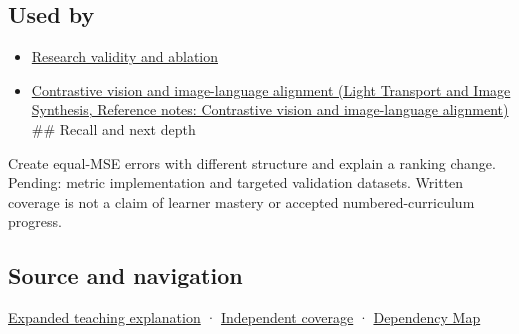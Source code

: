 \subsection{Used by}\label{appendix-b2c1846508bf-used-by}

\begin{itemize}
\item
  \hyperref[appendix-65788587ef78]{Research validity and ablation}
\item
  \href{../04-Light-Transport-and-Image-Synthesis/main.pdf\#nameddest=appendix-772f1fd96148}{Contrastive vision and image-language alignment (Light Transport and Image Synthesis, Reference notes: Contrastive vision and image-language alignment)} \#\# Recall and next depth
\end{itemize}

Create equal-MSE errors with different structure and explain a ranking change. Pending: metric implementation and targeted validation datasets. Written coverage is not a claim of learner mastery or accepted numbered-curriculum progress.

\subsection{Source and navigation}\label{appendix-b2c1846508bf-source-and-navigation}

\hyperref[04-visual-computing-ii-ch042-quality-numbers-need-a-question-they-can-actually-answer]{Expanded teaching explanation} · \hyperref[appendix-fd090d982a15-xr01---independent-seeing-and-representation-source]{Independent coverage} · \hyperref[appendix-4ad47bdd269a]{Dependency Map}
